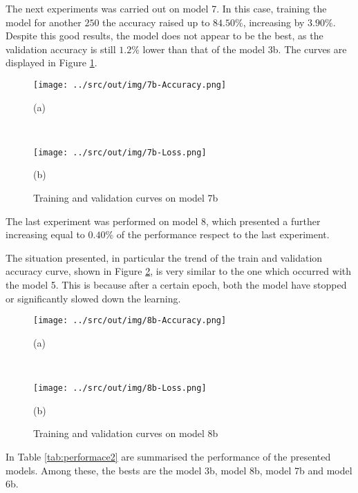 \documentclass[a4paper,12pt]{article} %
\begin{document}
	The next experiments was carried out on model 7. In this case, training the 
	model for another $250$ the accuracy raised up to $84.50\%$, increasing 
	by $3.90\%$. Despite this good results, the model does not appear to be the 
	best, as the validation accuracy is still $1.2\%$ lower than that of the 
	model 3b.
	The curves are displayed in Figure \ref{fig:model7b-performance}.
	
	\begin{figure}[H]
		\begin{minipage}[c]{.49\textwidth}
			\centering
			\texttt{[image: ../src/out/img/7b-Accuracy.png]}
			\caption*{(a)}
		\end{minipage}
		~
		\begin{minipage}[c]{.49\textwidth}
			\centering
			\texttt{[image: ../src/out/img/7b-Loss.png]}
			\caption*{(b)}
		\end{minipage}
		\caption{Training and validation curves on model 7b}
		\label{fig:model7b-performance}
	\end{figure}

	The last experiment was performed on model 8, which presented a further 
	increasing equal to $0.40\%$ of the performance respect to the last 
	experiment.
	
	The situation presented, in particular the trend of the train and 
	validation accuracy curve, shown in Figure \ref{fig:model8b-performance}, 
	is very similar to the one which occurred with the model 5. This is because 
	after a certain epoch, both the model have stopped or significantly slowed 
	down the learning.
	
	\begin{figure}[htb]
		\begin{minipage}[c]{.49\textwidth}
			\centering
			\texttt{[image: ../src/out/img/8b-Accuracy.png]}
			\caption*{(a)}
		\end{minipage}
		~
		\begin{minipage}[c]{.49\textwidth}
			\centering
			\texttt{[image: ../src/out/img/8b-Loss.png]}
			\caption*{(b)}
		\end{minipage}
		\caption{Training and validation curves on model 8b}
		\label{fig:model8b-performance}
	\end{figure}

	In Table \ref{tab:performace2} are summarised the performance of the 
	presented models. Among these, the bests are the model 3b, 
	model 8b, model 7b and model 6b. 
\end{document}
